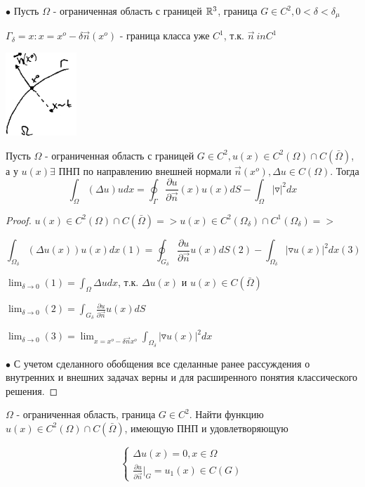 $\bullet$ Пусть $\Omega$ - ограниченная область с границей $\mathbb{R}^3$, граница $G \in C^2, 0 < \delta < \delta_{\mu}$

$\Gamma_{\delta} = {x: x = x^o - \delta \vec{n}(x^o)}$ - граница класса уже $C^1$, т.к. $\vec{n} \ in C^1$
\begin{center}
\includegraphics[width=0.2\textwidth]{31_2_new}
\end{center}
\begin{lemma}
Пусть $\Omega$ - ограниченная область с границей $G \in C^2, u(x) \in C^2(\Omega) \cap C(\bar{\Omega})$, а у $u(x) \exists $ ПНП по направлению внешней нормали $\vec{n}(x^o), \Delta u \in C(\Omega)$. Тогда $$\int_{\Omega} (\Delta u)udx = \oint_{\Gamma} \frac{\partial u}{\partial \vec{n}}(x) u(x)dS - \int_{\Omega} |\triangledown|^2 dx $$
\end{lemma}
\begin{proof}
$u(x) \in C^2(\Omega) \cap C(\bar{\Omega}) => u(x) \in C^2(\Omega_{\delta}) \cap C^1(\Omega_{\delta}) => $

$$\int_{\Omega_{\delta}}(\Delta u(x))u(x)dx (1) = \oint_{G_{\delta}} \frac{\partial u}{\partial \vec{n}}u(x)dS (2) - \int_{\Omega_{\delta}}|\triangledown u(x)|^2dx (3)$$

$\lim_{\delta \to 0}(1) = \int_{\Omega} \Delta udx$, т.к. $\Delta u(x)$ и $u(x) \in C(\bar{\Omega})$

$\lim_{\delta \to 0}(2) = \int_{G_{\delta}} \frac{\partial u}{\partial \vec{n}}u(x)dS $

$\lim_{\delta \to 0}(3) = \lim_{x = x^o - \delta \vec{n}x^o} \int_{\Omega_{\delta}} |\triangledown u(x)|^2dx$

$\bullet$ С учетом сделанного обобщения все сделанные ранее рассуждения о внутренних и внешних задачах верны и для расширенного понятия классического решения.
\end{proof}
\begin{theorem}
$\Omega$ - ограниченная область, граница $G \in C^2$. Найти функцию $u(x) \in C^2(\Omega) \cap C(\bar{\Omega})$, имеющую ПНП и удовлетворяющую 

\begin{equation}
\begin{cases}
\Delta u(x) = 0, x \in \Omega
\\
\frac{\partial u}{\partial \vec{n}}|_G = u_1(x) \in C(G)
\end{cases}
\end{equation}
\end{theorem}
